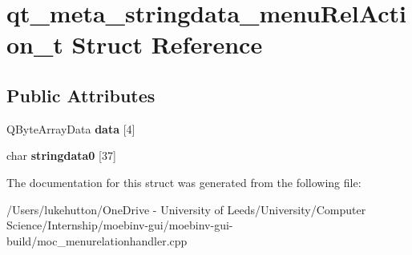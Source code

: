 \hypertarget{structqt__meta__stringdata__menu_rel_action__t}{}\section{qt\+\_\+meta\+\_\+stringdata\+\_\+menu\+Rel\+Action\+\_\+t Struct Reference}
\label{structqt__meta__stringdata__menu_rel_action__t}
\subsection*{Public Attributes}
\begin{DoxyCompactItemize}
\item 
\mbox{\label{structqt__meta__stringdata__menu_rel_action__t_a7b40c8a52e37a5c28251d7e999eafeaa}} 
Q\+Byte\+Array\+Data {\bfseries data} \mbox{[}4\mbox{]}
\item 
\mbox{\label{structqt__meta__stringdata__menu_rel_action__t_aad12ee0e27fa96033425cf66079ba224}} 
char {\bfseries stringdata0} \mbox{[}37\mbox{]}
\end{DoxyCompactItemize}


The documentation for this struct was generated from the following file\+:\begin{DoxyCompactItemize}
\item 
/\+Users/lukehutton/\+One\+Drive -\/ University of Leeds/\+University/\+Computer Science/\+Internship/moebinv-\/gui/moebinv-\/gui-\/build/moc\+\_\+menurelationhandler.\+cpp\end{DoxyCompactItemize}
